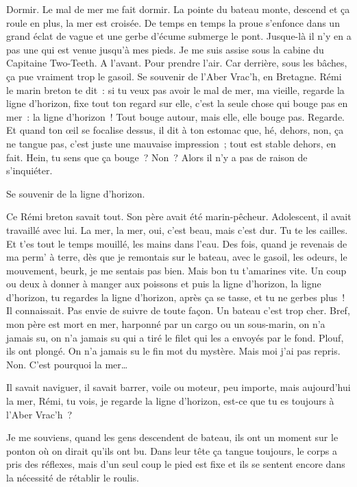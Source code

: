 \documentclass[twoside]{book} %
\begin{document}
\noindent Dormir. Le mal de mer me fait dormir. La pointe du bateau monte, descend et ça roule en plus, la mer est croisée. De temps en temps la proue s’enfonce dans un grand éclat de vague et une gerbe d’écume submerge le pont. Jusque-là il n’y en a pas une qui est venue jusqu’à mes pieds. Je me suis assise sous la cabine du Capitaine Two-Teeth. A l’avant. Pour prendre l’air. Car derrière, sous les bâches, ça pue vraiment trop le gasoil. Se souvenir de l’Aber Vrac’h, en Bretagne. Rémi le marin breton te dit : si tu veux pas avoir le mal de mer, ma vieille, regarde la ligne d’horizon, fixe tout ton regard sur elle, c’est la seule chose qui bouge pas en mer : la ligne d’horizon ! Tout bouge autour, mais elle, elle bouge pas. Regarde. Et quand ton œil se focalise dessus, il dit à ton estomac que, hé, dehors, non, ça ne tangue pas, c’est juste une mauvaise impression ; tout est stable dehors, en fait. Hein, tu sens que ça bouge ? Non ? Alors il n’y a pas de raison de s’inquiéter.\par
Se souvenir de la ligne d’horizon.\par
Ce Rémi breton savait tout. Son père avait été marin-pêcheur. Adolescent, il avait travaillé avec lui. La mer, la mer, oui, c’est beau, mais c’est dur. Tu te les cailles. Et t’es tout le temps mouillé, les mains dans l’eau. Des fois, quand je revenais de ma perm’ à terre, dès que je remontais sur le bateau, avec le gasoil, les odeurs, le mouvement, beurk, je me sentais pas bien. Mais bon tu t’amarines vite. Un coup ou deux à donner à manger aux poissons et puis la ligne d’horizon, la ligne d’horizon, tu regardes la ligne d’horizon, après ça se tasse, et tu ne gerbes plus ! Il connaissait. Pas envie de suivre de toute façon. Un bateau c’est trop cher. Bref, mon père est mort en mer, harponné par un cargo ou un sous-marin, on n’a jamais su, on n’a jamais su qui a tiré le filet qui les a envoyés par le fond. Plouf, ils ont plongé. On n’a jamais su le fin mot du mystère. Mais moi j’ai pas repris. Non. C’est pourquoi la mer…\par
Il savait naviguer, il savait barrer, voile ou moteur, peu importe, mais aujourd’hui la mer, Rémi, tu vois, je regarde la ligne d’horizon, est-ce que tu es toujours à l’Aber Vrac’h ?\par
Je me souviens, quand les gens descendent de bateau, ils ont un moment sur le ponton où on dirait qu’ils ont bu. Dans leur tête ça tangue toujours, le corps a pris des réflexes, mais d’un seul coup le pied est fixe et ils se sentent encore dans la nécessité de rétablir le roulis.
\end{document}
